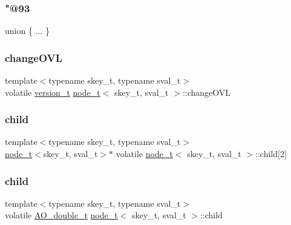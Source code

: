 \subsubsection{\texorpdfstring{"@93}{@93}}
{\footnotesize\ttfamily union \{ ... \} }

\mbox{\label{structnode__t_a04ef1d059a1c38a7941eecd535f32d05}} 
\subsubsection{\texorpdfstring{change\+O\+VL}{changeOVL}}
{\footnotesize\ttfamily template$<$typename skey\+\_\+t, typename sval\+\_\+t$>$ \\
volatile \hyperlink{ccavl__impl_8h_ad18cce847aba06882c0ceedf7c5b32dc}{version\+\_\+t} \hyperlink{structnode__t}{node\+\_\+t}$<$ skey\+\_\+t, sval\+\_\+t $>$\+::change\+O\+VL}

\mbox{\label{structnode__t_a0d79851d85c025ee10dc6fed095ab421}} 
\subsubsection{\texorpdfstring{child}{child}\hspace{0.1cm}{\footnotesize\ttfamily [1/2]}}
{\footnotesize\ttfamily template$<$typename skey\+\_\+t, typename sval\+\_\+t$>$ \\
\hyperlink{structnode__t}{node\+\_\+t}$<$skey\+\_\+t, sval\+\_\+t$>$$\ast$ volatile \hyperlink{structnode__t}{node\+\_\+t}$<$ skey\+\_\+t, sval\+\_\+t $>$\+::child\mbox{[}2\mbox{]}}

\mbox{\label{structnode__t_a87d96c3bd4e3cac7919e7f8878d73d4b}} 
\subsubsection{\texorpdfstring{child}{child}\hspace{0.1cm}{\footnotesize\ttfamily [2/2]}}
{\footnotesize\ttfamily template$<$typename skey\+\_\+t, typename sval\+\_\+t$>$ \\
volatile \hyperlink{structAO__double__t}{A\+O\+\_\+double\+\_\+t} \hyperlink{structnode__t}{node\+\_\+t}$<$ skey\+\_\+t, sval\+\_\+t $>$\+::child}

